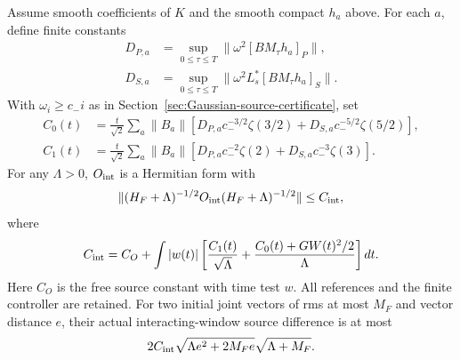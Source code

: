 \begin{proposition}
\label{prop:interacting-material-source}
Assume smooth coefficients of $K$ and the smooth compact $h_a$ above.
For each $a$, define finite constants
\begin{align*}
 D_{P,a}&=\sup_{0\le\tau\le T}
             \|\omega^2[B M_\tau h_a]_P\|,\\
 D_{S,a}&=\sup_{0\le\tau\le T}
             \|\omega^2L_s^*[B M_\tau h_a]_S\|.
\end{align*}
With $\omega_i\ge c_-i$ as in
Section~\ref{sec:Gaussian-source-certificate}, set
\begin{align*}
 C_0(t)&=\frac{t}{\sqrt2}\sum_a\|B_a\|
 [D_{P,a}c_-^{-3/2}\zeta(3/2)+D_{S,a}c_-^{-5/2}\zeta(5/2)],\\
 C_1(t)&=\frac{t}{\sqrt2}\sum_a\|B_a\|
 [D_{P,a}c_-^{-2}\zeta(2)+D_{S,a}c_-^{-3}\zeta(3)].
\end{align*}
For any $\Lambda>0$, $O_{\rm int}$ is a Hermitian form with
\begin{equation}
 \|(H_F+\Lambda)^{-1/2}O_{\rm int}
                   (H_F+\Lambda)^{-1/2}\|\le C_{\rm int},
 \label{eq:interacting-source-bound}
\end{equation}
where
\[
 C_{\rm int}=C_O+\int|w(t)|\left[
    \frac{C_1(t)}{\sqrt\Lambda}
   +\frac{C_0(t)+GW(t)^2/2}{\Lambda}\right]dt .
\]
Here $C_O$ is the free source constant with time test $w$.
All references and the finite controller are retained.
For two initial joint vectors of rms at most $M_F$ and vector
distance $e$, their actual interacting-window source difference is
at most
\begin{equation}
 2C_{\rm int}\sqrt{\Lambda e^2+2M_Fe}\sqrt{\Lambda+M_F}.
 \label{eq:interacting-source-error}
\end{equation}
\end{proposition}
